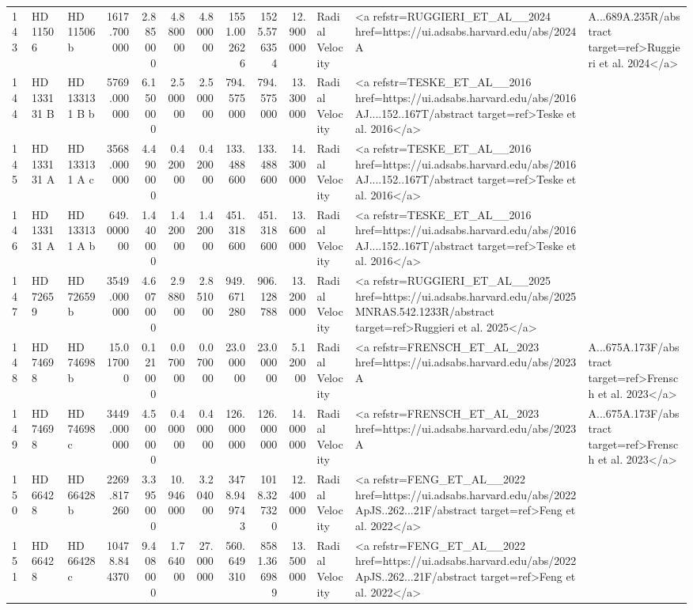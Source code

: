 \begin{tabular}{lllrrrrrrrll}
143 & HD 11506 & HD 11506 b & 1617.700000 & 2.885000 & 4.880000 & 4.800000 & 1551.002626 & 1525.576354 & 12.900000 & Radial Velocity & <a refstr=RUGGIERI_ET_AL__2024 href=https://ui.adsabs.harvard.edu/abs/2024A&A...689A.235R/abstract target=ref>Ruggieri et al. 2024</a> \\
144 & HD 133131 B & HD 133131 B b & 5769.000000 & 6.150000 & 2.500000 & 2.500000 & 794.575000 & 794.575000 & 13.300000 & Radial Velocity & <a refstr=TESKE_ET_AL__2016 href=https://ui.adsabs.harvard.edu/abs/2016AJ....152..167T/abstract target=ref>Teske et al. 2016</a> \\
145 & HD 133131 A & HD 133131 A c & 3568.000000 & 4.490000 & 0.420000 & 0.420000 & 133.488600 & 133.488600 & 14.300000 & Radial Velocity & <a refstr=TESKE_ET_AL__2016 href=https://ui.adsabs.harvard.edu/abs/2016AJ....152..167T/abstract target=ref>Teske et al. 2016</a> \\
146 & HD 133131 A & HD 133131 A b & 649.000000 & 1.440000 & 1.420000 & 1.420000 & 451.318600 & 451.318600 & 13.600000 & Radial Velocity & <a refstr=TESKE_ET_AL__2016 href=https://ui.adsabs.harvard.edu/abs/2016AJ....152..167T/abstract target=ref>Teske et al. 2016</a> \\
147 & HD 72659 & HD 72659 b & 3549.000000 & 4.607000 & 2.988000 & 2.851000 & 949.671280 & 906.128788 & 13.200000 & Radial Velocity & <a refstr=RUGGIERI_ET_AL__2025 href=https://ui.adsabs.harvard.edu/abs/2025MNRAS.542.1233R/abstract target=ref>Ruggieri et al. 2025</a> \\
148 & HD 74698 & HD 74698 b & 15.017000 & 0.121000 & 0.070000 & 0.070000 & 23.000000 & 23.000000 & 5.120000 & Radial Velocity & <a refstr=FRENSCH_ET_AL_2023 href=https://ui.adsabs.harvard.edu/abs/2023A&A...675A.173F/abstract target=ref>Frensch et al. 2023</a> \\
149 & HD 74698 & HD 74698 c & 3449.000000 & 4.500000 & 0.400000 & 0.400000 & 126.000000 & 126.000000 & 14.000000 & Radial Velocity & <a refstr=FRENSCH_ET_AL_2023 href=https://ui.adsabs.harvard.edu/abs/2023A&A...675A.173F/abstract target=ref>Frensch et al. 2023</a> \\
150 & HD 66428 & HD 66428 b & 2269.817260 & 3.395000 & 10.946000 & 3.204000 & 3478.949743 & 1018.327320 & 12.400000 & Radial Velocity & <a refstr=FENG_ET_AL__2022 href=https://ui.adsabs.harvard.edu/abs/2022ApJS..262...21F/abstract target=ref>Feng et al. 2022</a> \\
151 & HD 66428 & HD 66428 c & 10478.844370 & 9.408000 & 1.764000 & 27.000000 & 560.649310 & 8581.366989 & 13.500000 & Radial Velocity & <a refstr=FENG_ET_AL__2022 href=https://ui.adsabs.harvard.edu/abs/2022ApJS..262...21F/abstract target=ref>Feng et al. 2022</a> \\

\end{tabular}
